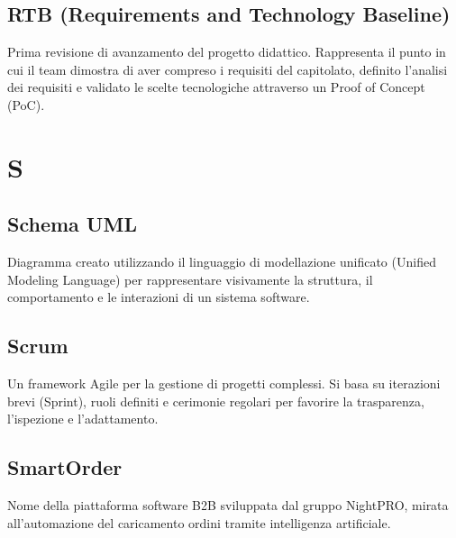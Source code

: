 \documentclass[a4paper, 11pt, oneside]{scrartcl} %
\begin{document}
\subsection*{RTB (Requirements and Technology Baseline)}
Prima revisione di avanzamento del progetto didattico. Rappresenta il punto in cui il team dimostra di aver compreso i requisiti del capitolato, definito l'analisi dei requisiti e validato le scelte tecnologiche attraverso un Proof of Concept (PoC).
\vspace{0.5cm}


\section*{S}


\subsection*{Schema UML}


Diagramma creato utilizzando il linguaggio di modellazione unificato (Unified Modeling Language) per rappresentare visivamente la struttura, il comportamento e le interazioni di un sistema software.

\vspace{0.5cm}

\subsection*{Scrum}
Un framework Agile per la gestione di progetti complessi. Si basa su iterazioni brevi (Sprint), ruoli definiti e cerimonie regolari per favorire la trasparenza, l'ispezione e l'adattamento.
\vspace{0.5cm}

\subsection*{SmartOrder}
Nome della piattaforma software B2B sviluppata dal gruppo NightPRO, mirata all'automazione del caricamento ordini tramite intelligenza artificiale.
\vspace{0.5cm}
\end{document}
